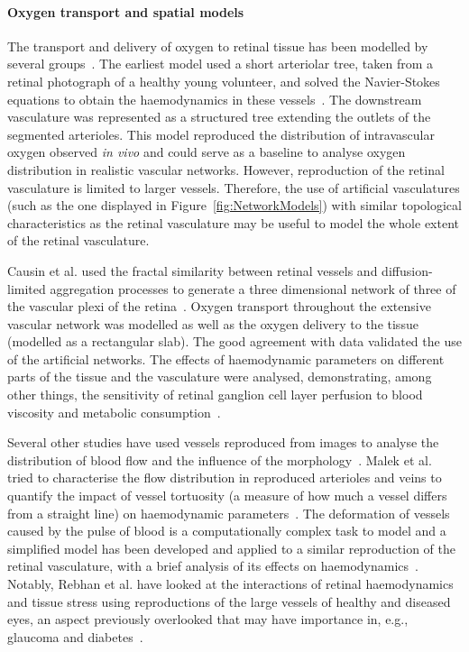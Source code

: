 \documentclass{article}
\begin{document}
\paragraph*{Oxygen transport and spatial models}

The transport and delivery of oxygen to retinal tissue has been modelled by several groups~\cite{Aquah_et_al_2021,Causin_2015,Liu_2009}.
The earliest model used a short arteriolar tree, taken from a retinal photograph of a healthy young volunteer, and solved the Navier-Stokes equations to obtain the haemodynamics in these vessels~\cite{Liu_2009}.
The downstream vasculature was represented as a structured tree extending the outlets of the segmented arterioles.
This model reproduced the distribution of intravascular oxygen observed \textit{in vivo} and could serve as a baseline to analyse oxygen distribution in realistic vascular networks.
However, reproduction of the retinal vasculature is limited to larger vessels.
Therefore, the use of artificial vasculatures (such as the one displayed in Figure~\ref{fig:NetworkModels}) with similar topological characteristics as the retinal vasculature may be useful to model the whole extent of the retinal vasculature.

Causin et al. used the fractal similarity between retinal vessels and diffusion-limited aggregation processes to generate a three dimensional network of three of the vascular plexi of the retina~\cite{Causin_2015}.
Oxygen transport throughout the extensive vascular network was modelled as well as the oxygen delivery to the tissue (modelled as a rectangular slab).
The good agreement with data validated the use of the artificial networks.
The effects of haemodynamic parameters on different parts of the tissue and the vasculature were analysed, demonstrating, among other things, the sensitivity of retinal ganglion cell layer perfusion to blood viscosity and metabolic consumption~\cite{Causin_2015}.


Several other studies have used vessels reproduced from images to analyse the distribution of blood flow and the influence of the morphology~\cite{Malek_2014,Malek_2015,Rebhan_2019}.
Malek et al. tried to characterise the flow distribution in reproduced arterioles and veins to quantify the impact of vessel tortuosity (a measure of how much a vessel differs from a straight line) on haemodynamic parameters~\cite{Malek_2014,Malek_2015}.
The deformation of vessels caused by the pulse of blood is a computationally complex task to model and a simplified model has been developed and applied to a similar reproduction of the retinal vasculature, with a brief analysis of its effects on haemodynamics~\cite{Aletti_2016}.
Notably, Rebhan et al. have looked at the interactions of retinal haemodynamics and tissue stress using reproductions of the large vessels of healthy and diseased eyes, an aspect previously overlooked that may have importance in, e.g., glaucoma and diabetes~\cite{Rebhan_2019}.
\end{document}

